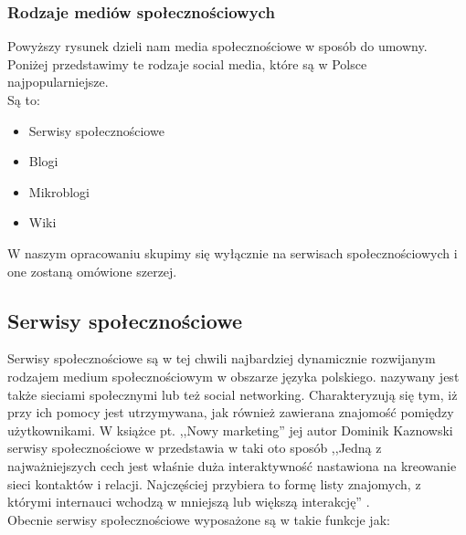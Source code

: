\subsubsection{Rodzaje mediów społecznościowych}

Powyższy rysunek dzieli nam media społecznościowe w sposób do umowny. Poniżej przedstawimy te rodzaje social media, które są w Polsce najpopularniejsze.\\

\noindent Są to:

\begin{itemize}
\item Serwisy społecznościowe
\item Blogi
\item Mikroblogi
\item Wiki
\end{itemize}

W naszym opracowaniu skupimy się wyłącznie na serwisach społecznościowych i one zostaną omówione szerzej.

\subsection{Serwisy społecznościowe}

Serwisy społecznościowe są w tej chwili najbardziej dynamicznie rozwijanym rodzajem medium społecznościowym w obszarze języka polskiego. nazywany jest także sieciami społecznymi lub też social networking. Charakteryzują się tym, iż przy ich pomocy jest utrzymywana, jak również zawierana znajomość pomiędzy użytkownikami. W książce pt. ,,Nowy marketing'' jej autor Dominik Kaznowski serwisy społecznościowe w przedstawia w taki oto sposób ,,Jedną z najważniejszych cech jest właśnie duża interaktywność nastawiona na kreowanie sieci kontaktów i relacji. Najczęściej przybiera to formę listy znajomych, z którymi internauci wchodzą w mniejszą lub większą interakcję'' \cite{url:kursusability-social-media}.\\

\noindent Obecnie serwisy społecznościowe wyposażone są w takie funkcje jak:

